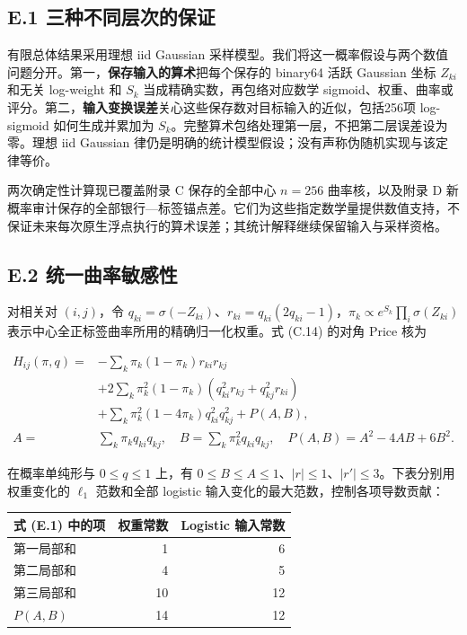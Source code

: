 \documentclass[11pt,a4paper]{article}
\begin{document}
\subsection*{E.1
三种不同层次的保证}\label{e.1-ux4e09ux79cdux4e0dux540cux5c42ux6b21ux7684ux4fddux8bc1}

有限总体结果采用理想 iid Gaussian
采样模型。我们将这一概率假设与两个数值问题分开。第一，\textbf{保存输入的算术}把每个保存的
binary64 活跃 Gaussian 坐标 \(Z_{ki}\) 和无关 log-weight 和 \(S_k\)
当成精确实数，再包络对应数学
sigmoid、权重、曲率或评分。第二，\textbf{输入变换误差}关心这些保存数对目标输入的近似，包括256项
log-sigmoid 如何生成并累加为
\(S_k\)。完整算术包络处理第一层，不把第二层误差设为零。理想 iid Gaussian
律仍是明确的统计模型假设；没有声称伪随机实现与该定律等价。

两次确定性计算现已覆盖附录 C 保存的全部中心 \(n=256\) 曲率核，以及附录 D
新概率审计保存的全部银行---标签锚点差。它们为这些指定数学量提供数值支持，不保证未来每次原生浮点执行的算术误差；其统计解释继续保留输入与采样资格。

\subsection*{E.2
统一曲率敏感性}\label{e.2-ux7edfux4e00ux66f2ux7387ux654fux611fux6027}

对相关对 \((i,j)\)，令
\(q_{ki}=\sigma(-Z_{ki})\)、\(r_{ki}=q_{ki}(2q_{ki}-1)\)，\(\pi_k\propto e^{S_k}\prod_i\sigma(Z_{ki})\)
表示中心全正标签曲率所用的精确归一化权重。式 (C.14) 的对角 Price 核为

\[
\begin{aligned}
H_{ij}(\pi,q)={}&-\sum_k\pi_k(1-\pi_k)r_{ki}r_{kj}\\
&+2\sum_k\pi_k^2(1-\pi_k)(q_{ki}^2r_{kj}+q_{kj}^2r_{ki})\\
&+\sum_k\pi_k^2(1-4\pi_k)q_{ki}^2q_{kj}^2+P(A,B),\\
A={}&\sum_k\pi_kq_{ki}q_{kj},\quad B=\sum_k\pi_k^2q_{ki}q_{kj},\quad
P(A,B)=A^2-4AB+6B^2.
\end{aligned}
\tag{E.1}
\]

在概率单纯形与 \(0\le q\le1\) 上，有
\(0\le B\le A\le1\)、\(|r|\le1\)、\(|r'|\le3\)。下表分别用权重变化的
\(\ell_1\) 范数和全部 logistic 输入变化的最大范数，控制各项导数贡献：

\begin{longtable}[]{@{}lrr@{}}
\toprule\noalign{}
式 (E.1) 中的项 & 权重常数 & Logistic 输入常数 \\
\midrule\noalign{}
\endhead
\bottomrule\noalign{}
\endlastfoot
第一局部和 & 1 & 6 \\
第二局部和 & 4 & 5 \\
第三局部和 & 10 & 12 \\
\(P(A,B)\) & 14 & 12 \\
\end{longtable}
\end{document}
